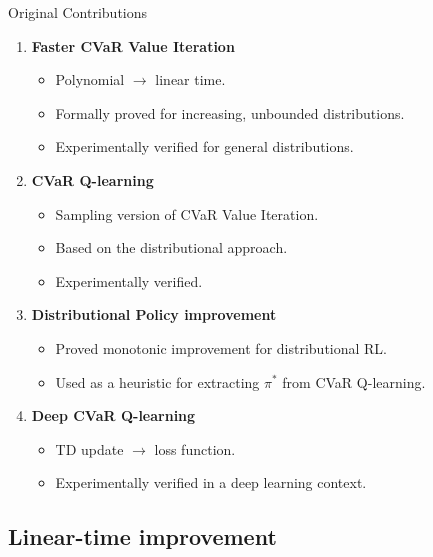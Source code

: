 \documentclass{beamer}
\begin{document}

\begin{frame}{Original Contributions}
\center
\begin{enumerate}
\item \textbf{Faster CVaR Value Iteration} 
\begin{itemize}
\item Polynomial $\to$ linear time.
\item Formally proved for increasing, unbounded distributions.
\item Experimentally verified for general distributions.
\end{itemize}

\item \textbf{CVaR Q-learning} 
\begin{itemize}
\item Sampling version of CVaR Value Iteration.
\item Based on the distributional approach.
\item Experimentally verified.
\end{itemize}
\item \textbf{Distributional Policy improvement}
\begin{itemize}
\item Proved monotonic improvement for distributional RL.
\item Used as a heuristic for extracting $\pi^*$ from CVaR Q-learning.
\end{itemize}
\item \textbf{Deep CVaR Q-learning}
\begin{itemize}
\item TD update $\to$ loss function.
\item Experimentally verified in a deep learning context.
\end{itemize}
\end{enumerate}

\end{frame}

\subsection{Linear-time improvement}
\end{document}
